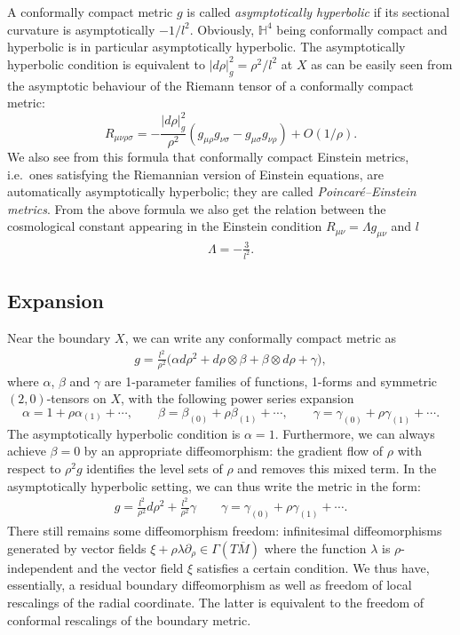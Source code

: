\documentclass[a4paper,12pt]{article}
\newcommand{\be}{\begin{eqnarray}}
\newcommand{\ee}{\end{eqnarray}}
\begin{document}
A conformally compact metric $g$ is called \emph{asymptotically hyperbolic} if its sectional curvature is asymptotically $-1/l^2$. Obviously, $\mathbb {H}^4$ being conformally compact and hyperbolic is in particular asymptotically hyperbolic. The asymptotically hyperbolic condition is equivalent to $|d\rho|^2_{g}=\rho^2/l^2$ at $X$ as can be easily seen from the asymptotic behaviour of the Riemann tensor of a conformally compact metric:
\[ R_{\mu\nu\rho\sigma}=-\frac{|d\rho|_{g}^2}{\rho^2}(g_{\mu\rho}g_{\nu\sigma}-g_{\mu\sigma}g_{\nu\rho})+O(1/\rho). \]
We also see from this formula that conformally compact Einstein metrics, i.e.\ ones satisfying the Riemannian version of Einstein equations, are automatically asymptotically hyperbolic; they are called \emph{Poincar\'e--Einstein metrics}. From the above formula we also get the relation between the cosmological constant appearing in the Einstein condition $R_{\mu\nu}=\Lambda g_{\mu\nu}$ and $l$
\be
\Lambda = - \frac{3}{l^2}.
\ee

\subsection{Expansion}

Near the boundary $X$, we can write any conformally compact metric as
\be\label{cc-metric}
g=\frac{l^2}{ \rho^2}\Big(\alpha d\rho^2+d\rho\otimes\beta+\beta\otimes d\rho+\gamma\Big),
\ee
where $\alpha$, $\beta$ and $\gamma$ are 1-parameter families of functions, 1-forms and symmetric $(2,0)$-tensors on $X$, with the following power series expansion
\[ \alpha=1+\rho\alpha_{(1)}+\cdots,\qquad\beta=\beta_{(0)}+\rho\beta_{(1)}+\cdots,\qquad \gamma=\gamma_{(0)}+\rho\gamma_{(1)}+\cdots. \]
The asymptotically hyperbolic condition is $\alpha=1$. Furthermore, we can always achieve $\beta=0$ by an appropriate diffeomorphism: the gradient flow of $\rho$ with respect to $\rho^2 g$ identifies the level sets of $\rho$ and removes this mixed term. In the  asymptotically hyperbolic setting, we can thus write the metric in the form:
\be\label {FG}
g=\frac{l^2}{\rho^2}d\rho^2+\frac{l^2}{\rho^2}\gamma \qquad \gamma=\gamma_{(0)}+\rho\gamma_{(1)}+\cdots. 
\ee
There still remains some diffeomorphism freedom: infinitesimal diffeomorphisms generated by vector fields $\xi+\rho\lambda\partial_\rho\in\Gamma(T\overline{M})$ where the function $\lambda$ is $\rho$-independent and the vector field $\xi$ satisfies a certain condition. We thus have, essentially, a residual boundary diffeomorphism as well as freedom of local rescalings of the radial coordinate. The latter is equivalent to the freedom of conformal rescalings of the boundary metric.
\end{document}
